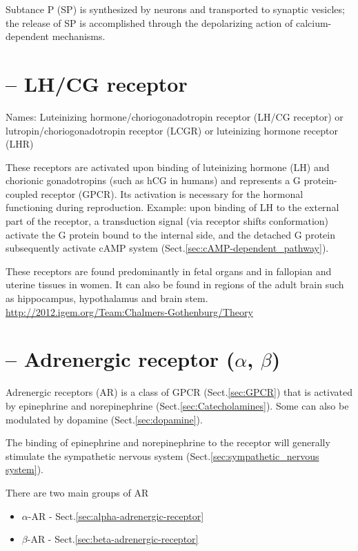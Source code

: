 Subtance P (SP) is synthesized by neurons and transported to synaptic vesicles;
the release of SP is accomplished through the depolarizing action of
calcium-dependent mechanisms.


\section{ -- LH/CG receptor}
\label{sec:LH/CG_receptor}

Names: Luteinizing hormone/choriogonadotropin receptor (LH/CG receptor)
or lutropin/choriogonadotropin receptor (LCGR) or luteinizing hormone receptor
(LHR)

These receptors are activated upon binding of luteinizing hormone (LH) and
chorionic gonadotropins (such as hCG in humans) and represents a G
protein-coupled receptor (GPCR). Its activation is necessary for the hormonal
functioning during reproduction. Example: upon binding of LH to the external
part of the receptor, a transduction signal (via receptor shifts conformation)
activate the G protein bound to the internal side, and the detached G protein
subsequently activate cAMP system (Sect.\ref{sec:cAMP-dependent_pathway}).

These receptors are found predominantly in fetal organs and in fallopian and
uterine tissues in women. It can also be found in regions of the adult brain
such as hippocampus, hypothalamus and brain stem.
\url{http://2012.igem.org/Team:Chalmers-Gothenburg/Theory}

\section[ -- Adrenergic receptor (alpha, beta)]{ -- Adrenergic receptor
($\alpha$, $\beta$)}
\label{sec:adrenergic_receptor}

Adrenergic receptors (AR) is a class of GPCR (Sect.\ref{sec:GPCR}) that is
activated by epinephrine and norepinephrine (Sect.\ref{sec:Catecholamines}).
Some can also be modulated by dopamine (Sect.\ref{sec:dopamine}).

The binding of epinephrine and norepinephrine to the receptor will generally
stimulate the sympathetic nervous system (Sect.\ref{sec:sympathetic_nervous
system}).

There are two main groups of AR
\begin{itemize}
  \item $\alpha$-AR - Sect.\ref{sec:alpha-adrenergic-receptor}
   
  \item $\beta$-AR - Sect.\ref{sec:beta-adrenergic-receptor}
\end{itemize}
 

